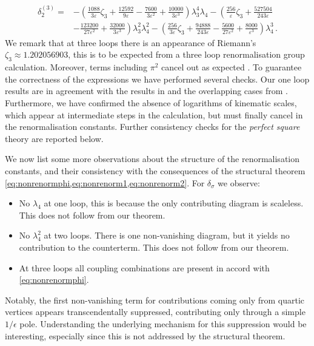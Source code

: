 \documentclass[a4paper,11pt]{article}
\begin{document}
\begin{align}
    \delta_2^{(3)} =& - \left(\frac{1088}{3\varepsilon}  \zeta_3 + \frac{12592}{9\varepsilon} - \frac{7600}{3\varepsilon^2} + \frac{10000}{3\varepsilon^3} \right)\lambda_3^4\lambda_4  - \left(\frac{256}{\varepsilon}  \zeta_3 + \frac{527504}{243\varepsilon} \right.\nonumber \\
    &\left.- \frac{123200}{27\varepsilon^2} + \frac{32000}{3\varepsilon^3} \right)\lambda_3^2\lambda^2_4 - \left(\frac{256}{3\varepsilon}  \zeta_3 + \frac{94888}{243\varepsilon} - \frac{5600}{27\varepsilon^2}  + \frac{8000}{\varepsilon^3} \right)\lambda_4^3 \,.
\end{align}
We remark that at three loops there is an appearance of Riemann's  $\zeta_3\approx 1.202056903$, this is to be expected from a three loop renormalisation group calculation. Moreover, terms including $\pi^2$  cancel out as expected \cite{Boito:2016pwf, Davies:2017hyl, Baikov:2018wgs}. To guarantee the correctness of the expressions we have performed several checks.  Our one loop results are in agreement with the results in \cite{Holdom:2023usn,Holdom:2024cfq} and the overlapping cases from \cite{Safari:2021ocb,Tseytlin:2022flu}. Furthermore, we have confirmed the absence of logarithms of kinematic scales, which appear at intermediate steps in the calculation, but must finally cancel in the renormalisation constants.  Further consistency checks for the \emph{perfect square} theory are reported below.  

We now list some more observations about the structure of the renormalisation constants, and their consistency with the consequences of the structural theorem 
\cref{eq:nonrenormphi,eq:nonrenorm1,eq:nonrenorm2}.
For $\delta_\sigma$ we observe:
\begin{itemize}
    \item No $\lambda_4$ at one loop, this is because the only contributing diagram is scaleless. This does not follow from our theorem. 
    \item No $\lambda_4^2$ at two loops. There is one non-vanishing diagram, but it yields no contribution to the counterterm. This does not follow from our theorem. 
    \item At three loops all coupling combinations are present in accord with \cref{eq:nonrenormphi}.
\end{itemize}
Notably, the first non-vanishing term for contributions coming only from quartic vertices appears transcendentally suppressed, contributing only through a simple $1/\epsilon$ pole. Understanding the underlying mechanism for this suppression would be interesting, especially since this is not addressed by the structural theorem. 
\end{document}
